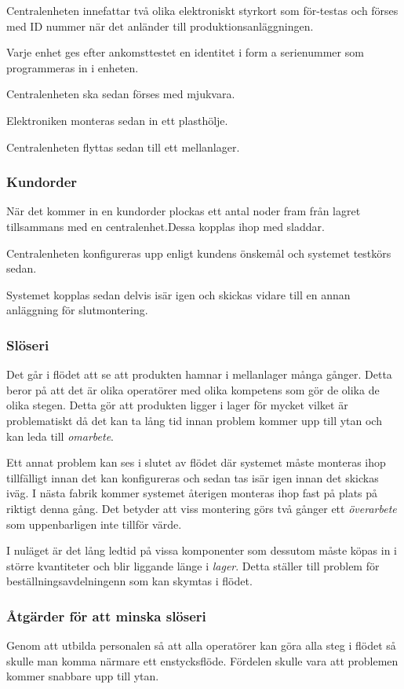 \documentclass{article}
\begin{document}
Centralenheten innefattar två olika elektroniskt styrkort som för-testas och förses med ID nummer när det anländer till produktionsanläggningen. 

Varje enhet ges efter ankomsttestet en identitet i form a serienummer som programmeras in i enheten.

Centralenheten ska sedan förses med mjukvara.

Elektroniken monteras sedan in ett plasthölje.

Centralenheten flyttas sedan till ett mellanlager.

\subsubsection*{Kundorder}
När det kommer in en kundorder plockas ett antal noder fram från lagret tillsammans med en centralenhet.Dessa kopplas ihop med sladdar.

Centralenheten konfigureras upp enligt kundens önskemål och systemet testkörs sedan. 

Systemet kopplas sedan delvis isär igen och skickas vidare till en annan anläggning för slutmontering.

\subsubsection*{Slöseri}
Det går i flödet att se att produkten hamnar i mellanlager många gånger. Detta beror på att det är olika operatörer med olika kompetens som gör de olika de olika stegen. Detta gör att produkten ligger i lager för mycket vilket är problematiskt då det kan ta lång tid innan problem kommer upp till ytan och kan leda till \emph{omarbete}.

Ett annat problem kan ses i slutet av flödet där systemet måste monteras ihop tillfälligt innan det kan konfigureras och sedan tas isär igen innan det skickas iväg. I nästa fabrik kommer systemet återigen monteras ihop fast på plats på riktigt denna gång. Det betyder att viss montering görs två gånger ett \emph{överarbete} som uppenbarligen inte tillför värde.

I nuläget är det lång ledtid på vissa komponenter som dessutom måste köpas in i större kvantiteter och blir liggande länge i \emph{lager}. Detta ställer till problem för beställningsavdelningenn som kan skymtas i flödet.

\subsubsection*{Åtgärder för att minska slöseri}
Genom att utbilda personalen så att alla operatörer kan göra alla steg i flödet så skulle man komma närmare ett enstycksflöde. Fördelen skulle vara att problemen kommer snabbare upp till ytan.
\end{document}
